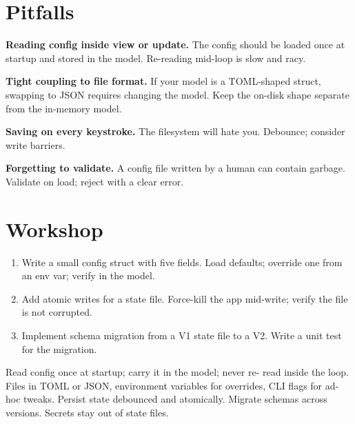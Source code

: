 \section{Pitfalls}

\begin{warning}
\textbf{Reading config inside view or update.} The config
should be loaded once at startup and stored in the model.
Re-reading mid-loop is slow and racy.
\end{warning}

\begin{warning}
\textbf{Tight coupling to file format.} If your model is a
TOML-shaped struct, swapping to JSON requires changing the
model. Keep the on-disk shape separate from the in-memory
model.
\end{warning}

\begin{warning}
\textbf{Saving on every keystroke.} The filesystem will hate
you. Debounce; consider write barriers.
\end{warning}

\begin{warning}
\textbf{Forgetting to validate.} A config file written by a
human can contain garbage. Validate on load; reject with a
clear error.
\end{warning}

\section*{Workshop}

\begin{enumerate}[leftmargin=*]
  \item Write a small config struct with five fields. Load
    defaults; override one from an env var; verify in the
    model.
  \item Add atomic writes for a state file. Force-kill the
    app mid-write; verify the file is not corrupted.
  \item Implement schema migration from a V1 state file to a
    V2. Write a unit test for the migration.
\end{enumerate}

\begin{recap}
Read config once at startup; carry it in the model; never re-
read inside the loop. Files in TOML or JSON, environment
variables for overrides, CLI flags for ad-hoc tweaks. Persist
state debounced and atomically. Migrate schemas across
versions. Secrets stay out of state files.
\end{recap}
